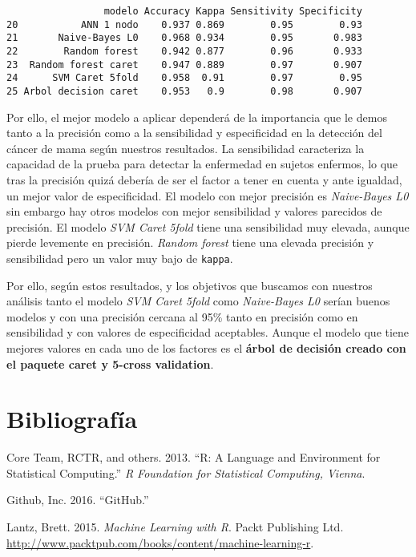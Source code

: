 \documentclass[
]{article}
\newenvironment{Shaded}{\begin{snugshade}}{\end{snugshade}}
\newcommand{\KeywordTok}[1]{\textcolor[rgb]{0.13,0.29,0.53}{\textbf{#1}}}
\newcommand{\NormalTok}[1]{#1}
\newcommand{\OperatorTok}[1]{\textcolor[rgb]{0.81,0.36,0.00}{\textbf{#1}}}
\begin{document}
\begin{Shaded}
\end{Shaded}

\begin{verbatim}
                 modelo Accuracy Kappa Sensitivity Specificity
20           ANN 1 nodo    0.937 0.869        0.95        0.93
21       Naive-Bayes L0    0.968 0.934        0.95       0.983
22        Random forest    0.942 0.877        0.96       0.933
23  Random forest caret    0.947 0.889        0.97       0.907
24      SVM Caret 5fold    0.958  0.91        0.97        0.95
25 Arbol decision caret    0.953   0.9        0.98       0.907
\end{verbatim}

Por ello, el mejor modelo a aplicar dependerá de la importancia que le
demos tanto a la precisión como a la sensibilidad y especificidad en la
detección del cáncer de mama según nuestros resultados. La sensibilidad
caracteriza la capacidad de la prueba para detectar la enfermedad en
sujetos enfermos, lo que tras la precisión quizá debería de ser el
factor a tener en cuenta y ante igualdad, un mejor valor de
especificidad. El modelo con mejor precisión es \emph{Naive-Bayes L0}
sin embargo hay otros modelos con mejor sensibilidad y valores parecidos
de precisión. El modelo \emph{SVM Caret 5fold} tiene una sensibilidad
muy elevada, aunque pierde levemente en precisión. \emph{Random forest}
tiene una elevada precisión y sensibilidad pero un valor muy bajo de
\texttt{kappa}.

Por ello, según estos resultados, y los objetivos que buscamos con
nuestros análisis tanto el modelo \emph{SVM Caret 5fold} como
\emph{Naive-Bayes L0} serían buenos modelos y con una precisión cercana
al 95\% tanto en precisión como en sensibilidad y con valores de
especificidad aceptables. Aunque el modelo que tiene mejores valores en
cada uno de los factores es el \textbf{árbol de decisión creado con el
paquete caret y 5-cross validation}.

\hypertarget{bibliografuxeda}{%
\section*{Bibliografía}\label{bibliografuxeda}}

\hypertarget{refs}{}
\leavevmode\hypertarget{ref-core2013r}{}%
Core Team, RCTR, and others. 2013. ``R: A Language and Environment for
Statistical Computing.'' \emph{R Foundation for Statistical Computing,
Vienna}.

\leavevmode\hypertarget{ref-github2016github}{}%
Github, Inc. 2016. ``GitHub.''

\leavevmode\hypertarget{ref-lantz2015machine}{}%
Lantz, Brett. 2015. \emph{Machine Learning with R}. Packt Publishing
Ltd. \url{http://www.packtpub.com/books/content/machine-learning-r}.
\end{document}
